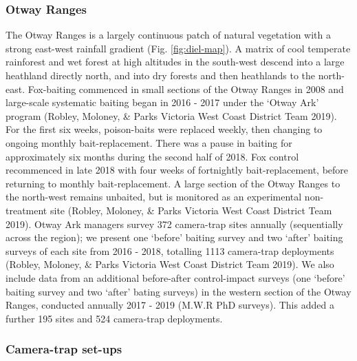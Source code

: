 \documentclass[11pt,a4paper,titlepage,twoside,openright]{style/unimelbthesis}
\begin{document}
\begin{mainmatter}
\hypertarget{otway-ranges-2}{%
\subsubsection{Otway Ranges}\label{otway-ranges-2}}

The Otway Ranges is a largely continuous patch of natural vegetation with a strong east-west rainfall gradient (Fig. \ref{fig:diel-map}). A matrix of cool temperate rainforest and wet forest at high altitudes in the south-west descend into a large heathland directly north, and into dry forests and then heathlands to the north-east. Fox-baiting commenced in small sections of the Otway Ranges in 2008 and large-scale systematic baiting began in 2016 - 2017 under the `Otway Ark' program (Robley, Moloney, \& Parks Victoria West Coast District Team 2019). For the first six weeks, poison-baits were replaced weekly, then changing to ongoing monthly bait-replacement. There was a pause in baiting for approximately six months during the second half of 2018. Fox control recommenced in late 2018 with four weeks of fortnightly bait-replacement, before returning to monthly bait-replacement. A large section of the Otway Ranges to the north-west remains unbaited, but is monitored as an experimental non-treatment site (Robley, Moloney, \& Parks Victoria West Coast District Team 2019). Otway Ark managers survey 372 camera-trap sites annually (sequentially across the region); we present one `before' baiting survey and two `after' baiting surveys of each site from 2016 - 2018, totalling 1113 camera-trap deployments (Robley, Moloney, \& Parks Victoria West Coast District Team 2019). We also include data from an additional before-after control-impact surveys (one `before' baiting survey and two `after' bating surveys) in the western section of the Otway Ranges, conducted annually 2017 - 2019 (M.W.R PhD surveys). This added a further 195 sites and 524 camera-trap deployments.

\hypertarget{camera-trap-set-ups-1}{%
\subsubsection{Camera-trap set-ups}\label{camera-trap-set-ups-1}}


\end{mainmatter}
\end{document}
